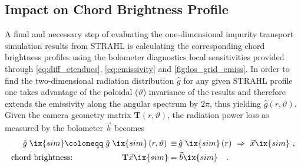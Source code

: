         \subsection{Impact on Chord Brightness Profile}\label{subsec:strahlchord}%
%
            A final and necessary step of evaluating the one-dimensional impurity transport simulation results from STRAHL is calculating the corresponding chord brightness profiles using the bolometer diagnostics local sensitivities provided through \cref{eq:diff_etendues}, \ref{eq:emissivity} and \cref{fig:los_grid_emiss}. In order to find the two-dimensional radiation distribution $\mathrel{\hat{g}}$ for any given STRAHL profile one takes advantage of the poloidal ($\vartheta$) invariance of the results and therefore extends the emissivity along the angular spectrum by  $2\pi$, thus yielding $\mathrel{\hat{g}}\left(r,\vartheta\right)$. Given the camera geometry matrix $\mathbf{T}\left(r,\vartheta\right)$, the radiation power loss as measured by the bolometer $\vec{b}$ becomes%
%
            \begin{align}%
                \begin{split}\label{eq:forward_lint}%
                    \mathrel{\hat{g}}\ix{sim}\coloneqq\mathrel{\hat{g}}\ix{sim}\left(r,\vartheta\right)\,&\equiv\,\mathrel{\hat{g}}\ix{sim}\left(r\right)\,\,\Rightarrow\,\,\vec{x}\ix{sim}\,\,,\\%
                    \text{chord brightness:}\qquad\qquad\qquad\mathbf{T}\vec{x}\ix{sim}&=\vec{b}\ix{sim}\quad.%
                \end{split}%
            \end{align}%
%
            \begin{figure}[t]%
                \centering%
                \begin{minipage}[b]{0.48\textwidth}%
                    \centering%
                \end{minipage}%
                \hfill%
                \begin{minipage}[b]{0.48\textwidth}%
                    \centering%
                \end{minipage}%
                \label{fig:chord_forward_exp_vs_STRAHL}%
            \end{figure}%
